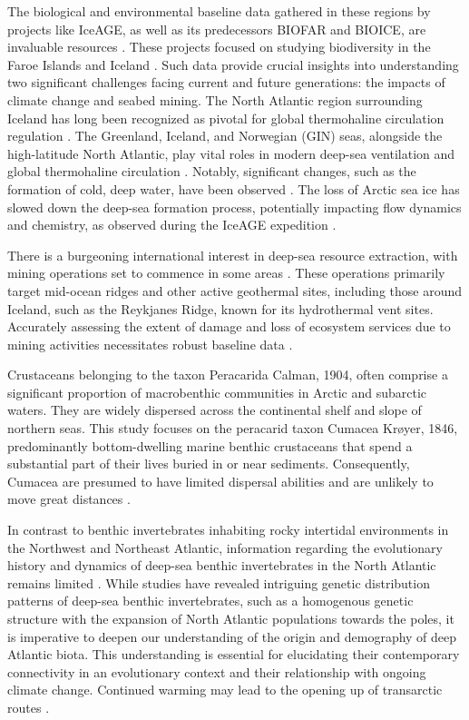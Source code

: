 The biological and environmental baseline data gathered in these regions by projects like IceAGE, as well as its predecessors BIOFAR and BIOICE, are invaluable resources \citep{meisner_prefacebiodiversity_2018}. These projects focused on studying biodiversity in the Faroe Islands and Iceland \citep{meisner_prefacebiodiversity_2018}. Such data provide crucial insights into understanding two significant challenges facing current and future generations: the impacts of climate change and seabed mining. The North Atlantic region surrounding Iceland has long been recognized as pivotal for global thermohaline circulation regulation \citep{meisner_prefacebiodiversity_2018}. The Greenland, Iceland, and Norwegian (GIN) seas, alongside the high-latitude North Atlantic, play vital roles in modern deep-sea ventilation and global thermohaline circulation \citep{johannessen_relationship_1994}. Notably, significant changes, such as the formation of cold, deep water, have been observed \citep{meisner_prefacebiodiversity_2018}. The loss of Arctic sea ice has slowed down the deep-sea formation process, potentially impacting flow dynamics and chemistry, as observed during the IceAGE expedition \citep{meisner_prefacebiodiversity_2018}.

There is a burgeoning international interest in deep-sea resource extraction, with mining operations set to commence in some areas \citep{mengerink_call_2014}. These operations primarily target mid-ocean ridges and other active geothermal sites, including those around Iceland, such as the Reykjanes Ridge, known for its hydrothermal vent sites. Accurately assessing the extent of damage and loss of ecosystem services due to mining activities necessitates robust baseline data \citep{meisner_prefacebiodiversity_2018}.

Crustaceans belonging to the taxon Peracarida Calman, 1904, often comprise a significant proportion of macrobenthic communities in Arctic and subarctic waters. They are widely dispersed across the continental shelf and slope of northern seas. This study focuses on the peracarid taxon Cumacea Krøyer, 1846, predominantly bottom-dwelling marine benthic crustaceans that spend a substantial part of their lives buried in or near sediments. Consequently, Cumacea are presumed to have limited dispersal abilities and are unlikely to move great distances \citep{uhlir_adding_2021}.

In contrast to benthic invertebrates inhabiting rocky intertidal environments in the Northwest and Northeast Atlantic, information regarding the evolutionary history and dynamics of deep-sea benthic invertebrates in the North Atlantic remains limited \citep{jennings_phylogeographic_2014}. While studies have revealed intriguing genetic distribution patterns of deep-sea benthic invertebrates, such as a homogenous genetic structure with the expansion of North Atlantic populations towards the poles, it is imperative to deepen our understanding of the origin and demography of deep Atlantic biota. This understanding is essential for elucidating their contemporary connectivity in an evolutionary context and their relationship with ongoing climate change. Continued warming may lead to the opening up of transarctic routes \citep{jennings_phylogeographic_2014}.

